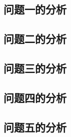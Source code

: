 \documentclass[../main.tex]{subfiles}
\begin{document}

\subsection{问题一的分析}


\subsection{问题二的分析}


\subsection{问题三的分析}


\subsection{问题四的分析}


\subsection{问题五的分析}


  
\end{document}

